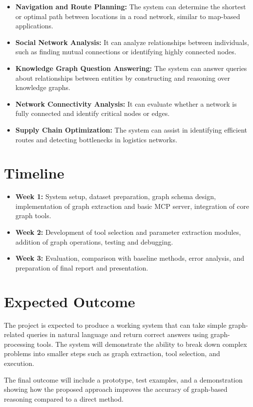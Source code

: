 \documentclass[11pt,a4paper]{article}
\begin{document}
\begin{itemize}
    \item \textbf{Navigation and Route Planning:} 
    The system can determine the shortest or optimal path between locations in a road network, similar to map-based applications.

    \item \textbf{Social Network Analysis:} 
    It can analyze relationships between individuals, such as finding mutual connections or identifying highly connected nodes.

    \item \textbf{Knowledge Graph Question Answering:} 
    The system can answer queries about relationships between entities by constructing and reasoning over knowledge graphs.

    \item \textbf{Network Connectivity Analysis:} 
    It can evaluate whether a network is fully connected and identify critical nodes or edges.

    \item \textbf{Supply Chain Optimization:} 
    The system can assist in identifying efficient routes and detecting bottlenecks in logistics networks.
\end{itemize}

\section{Timeline}
\begin{itemize}
    \item \textbf{Week 1:} System setup, dataset preparation, graph schema design, implementation of graph extraction and basic MCP server, integration of core graph tools.
    \item \textbf{Week 2:} Development of tool selection and parameter extraction modules, addition of graph operations, testing and debugging.
    \item \textbf{Week 3:} Evaluation, comparison with baseline methods, error analysis, and preparation of final report and presentation. \\
\end{itemize}

\section{Expected Outcome}

The project is expected to produce a working system that can take simple graph-related queries in natural language and return correct answers using graph-processing tools. The system will demonstrate the ability to break down complex problems into smaller steps such as graph extraction, tool selection, and execution.

The final outcome will include a prototype, test examples, and a demonstration showing how the proposed approach improves the accuracy of graph-based reasoning compared to a direct method.
\end{document}
